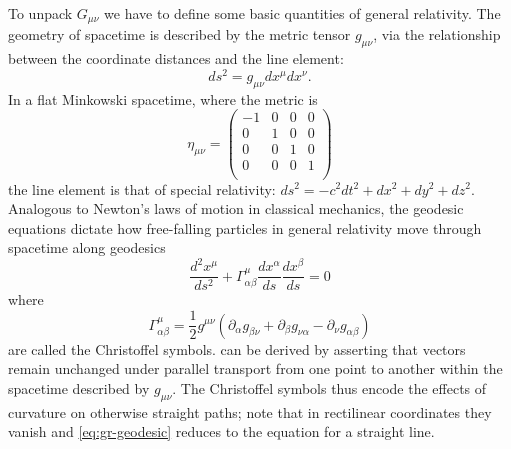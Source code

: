 To unpack $G_{\mu\nu}$ we have to define some basic quantities of general relativity.
The geometry of spacetime is described by the metric tensor $g_{\mu\nu}$, via the relationship between the coordinate distances and the line element:
\begin{equation}
	ds^2 = g_{\mu\nu}dx^{\mu}dx^{\nu}.
\end{equation}
In a flat Minkowski spacetime, where the metric is
\begin{equation}
	\eta_{\mu\nu} = \left(
			\begin{matrix}
				-1 & 0 & 0 & 0\\
			  0 & 1 & 0 & 0\\
				0 & 0 & 1 & 0\\
				0 & 0 & 0 & 1\\
			\end{matrix}
		\right)
\end{equation}
the line element is that of special relativity: $ds^2 = -c^2 dt^2 + dx^2 + dy^2 + dz^2$.
Analogous to Newton's laws of motion in classical mechanics, the geodesic equations dictate how free-falling particles in general relativity move through spacetime along geodesics
\begin{equation}\label{eq:gr-geodesic}
	\frac{d^2x^{\mu}}{ds^2} + \Gamma_{\alpha \beta}^{\mu} \frac{dx^{\alpha}}{ds} \frac{dx^{\beta}}{ds} = 0
\end{equation}
where
\begin{equation}\label{eq:gr-christoffel}
	\Gamma_{\alpha \beta}^{\mu} = \frac{1}{2} g^{\mu\nu} \left( \partial_{\alpha} g_{\beta\nu} + \partial_{\beta} g_{\nu\alpha} - \partial_{\nu} g_{\alpha\beta} \right)
\end{equation}
are called the Christoffel symbols.
 can be derived by asserting that vectors remain unchanged under parallel transport from one point to another within the spacetime described by $g_{\mu\nu}$.
The Christoffel symbols thus encode the effects of curvature on otherwise straight paths; note that in rectilinear coordinates they vanish and \cref{eq:gr-geodesic} reduces to the equation for a straight line.

